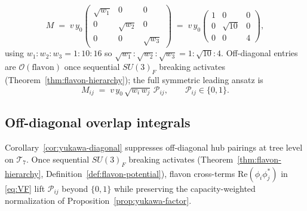 \documentclass[aps,prd,onecolumn,amsmath,amssymb,nofootinbib,11pt]{revtex4-2}
\numberwithin{equation}{section}
\theoremstyle{plain}
\theoremstyle{definition}
\theoremstyle{remark}
\begin{document}
\begin{equation}\label{eq:mass-matrix-explicit}
  M
  \;=\;
  v\,y_0
  \begin{pmatrix}
    \sqrt{w_1} & 0 & 0 \\
    0 & \sqrt{w_2} & 0 \\
    0 & 0 & \sqrt{w_3}
  \end{pmatrix}
  \;=\;
  v\,y_0
  \begin{pmatrix}
    1 & 0 & 0 \\
    0 & \sqrt{10} & 0 \\
    0 & 0 & 4
  \end{pmatrix},
\end{equation}
using $w_1:w_2:w_3=1:10:16$ so $\sqrt{w_1}:\sqrt{w_2}:\sqrt{w_3}=1:\sqrt{10}:4$.
Off-diagonal entries are $\mathcal{O}(\text{flavon})$ once sequential
$SU(3)_F$ breaking activates (Theorem~\ref{thm:flavon-hierarchy}); the full
symmetric leading ansatz is
\begin{equation}\label{eq:mass-matrix-full}
  M_{ij} \;=\; v\,y_0\,\sqrt{w_i\,w_j}\,\mathcal{P}_{ij},
  \qquad
  \mathcal{P}_{ij}\in\{0,1\}.
\end{equation}

\subsection{Off-diagonal overlap integrals}
\label{sec:yukawa:offdiag}

Corollary~\ref{cor:yukawa-diagonal} suppresses off-diagonal hub pairings at
tree level on $\mathcal{T}_7$. Once sequential $SU(3)_F$ breaking activates
(Theorem~\ref{thm:flavon-hierarchy}, Definition~\ref{def:flavon-potential}), flavon
cross-terms $\mathrm{Re}(\phi_i\phi_j^*)$ in \eqref{eq:VF} lift
$\mathcal{P}_{ij}$ beyond $\{0,1\}$ while preserving the capacity-weighted
normalization of Proposition~\ref{prop:yukawa-factor}.
\end{document}
